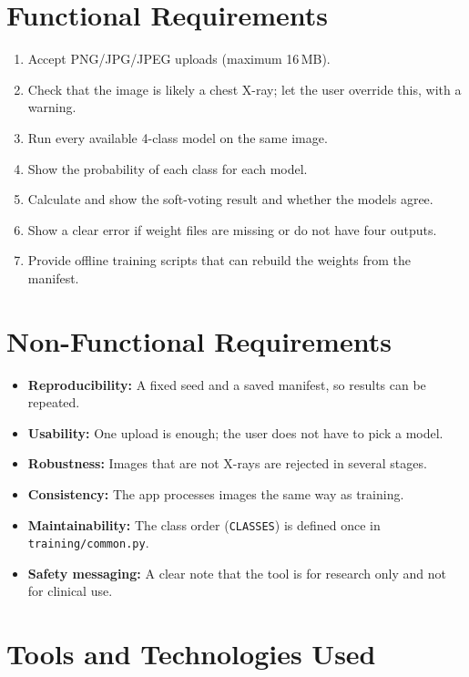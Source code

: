 \section{Functional Requirements}

\begin{enumerate}
    \item Accept PNG/JPG/JPEG uploads (maximum 16\,MB).
    \item Check that the image is likely a chest X-ray; let the user override this, with a warning.
    \item Run every available 4-class model on the same image.
    \item Show the probability of each class for each model.
    \item Calculate and show the soft-voting result and whether the models agree.
    \item Show a clear error if weight files are missing or do not have four outputs.
    \item Provide offline training scripts that can rebuild the weights from the manifest.
\end{enumerate}

\section{Non-Functional Requirements}

\begin{itemize}[label={}, leftmargin=0pt]
    \item \textbf{Reproducibility:} A fixed seed and a saved manifest, so results can be repeated.
    \item \textbf{Usability:} One upload is enough; the user does not have to pick a model.
    \item \textbf{Robustness:} Images that are not X-rays are rejected in several stages.
    \item \textbf{Consistency:} The app processes images the same way as training.
    \item \textbf{Maintainability:} The class order (\texttt{CLASSES}) is defined once in \texttt{training/common.py}.
    \item \textbf{Safety messaging:} A clear note that the tool is for research only and not for clinical use.
\end{itemize}

\section{Tools and Technologies Used}

